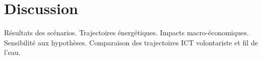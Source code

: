 \chapter{Discussion}\label{ch:results}

Résultats des scénarios. Trajectoires énergétiques. Impacts macro-économiques. Sensibilité aux hypothèses. Comparaison des trajectoires ICT volontariste et fil de l'eau.

